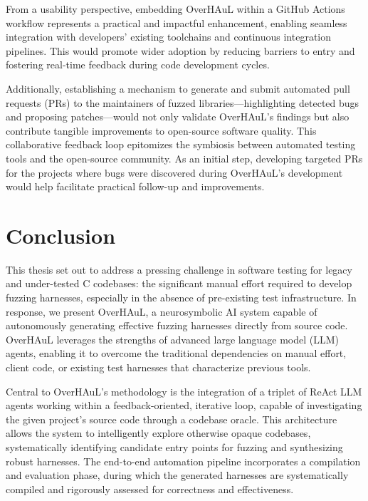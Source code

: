\documentclass[
  a4paper,
]{scrreprt}
\theoremstyle{definition}
\theoremstyle{remark}
\begin{document}
From a usability perspective, embedding OverHAuL within a GitHub Actions
workflow represents a practical and impactful enhancement, enabling
seamless integration with developers' existing toolchains and continuous
integration pipelines. This would promote wider adoption by reducing
barriers to entry and fostering real-time feedback during code
development cycles.

Additionally, establishing a mechanism to generate and submit automated
pull requests (PRs) to the maintainers of fuzzed
libraries---highlighting detected bugs and proposing patches---would not
only validate OverHAuL's findings but also contribute tangible
improvements to open-source software quality. This collaborative
feedback loop epitomizes the symbiosis between automated testing tools
and the open-source community. As an initial step, developing targeted
PRs for the projects where bugs were discovered during OverHAuL's
development would help facilitate practical follow-up and improvements.


\chapter{Conclusion}\label{conclusion}

This thesis set out to address a pressing challenge in software testing
for legacy and under-tested C codebases: the significant manual effort
required to develop fuzzing harnesses, especially in the absence of
pre-existing test infrastructure. In response, we present OverHAuL, a
neurosymbolic AI system capable of autonomously generating effective
fuzzing harnesses directly from source code. OverHAuL leverages the
strengths of advanced large language model (LLM) agents, enabling it to
overcome the traditional dependencies on manual effort, client code, or
existing test harnesses that characterize previous tools.

Central to OverHAuL's methodology is the integration of a triplet of
ReAct LLM agents working within a feedback-oriented, iterative loop,
capable of investigating the given project's source code through a
codebase oracle. This architecture allows the system to intelligently
explore otherwise opaque codebases, systematically identifying candidate
entry points for fuzzing and synthesizing robust harnesses. The
end-to-end automation pipeline incorporates a compilation and evaluation
phase, during which the generated harnesses are systematically compiled
and rigorously assessed for correctness and effectiveness.
\end{document}
